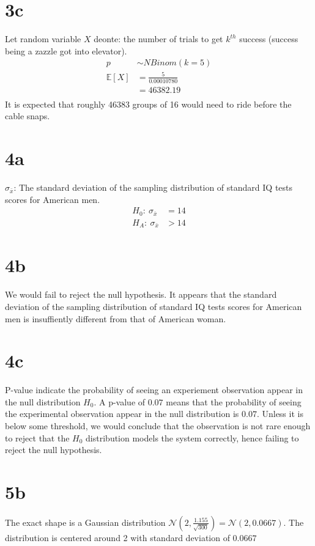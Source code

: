 \documentclass{article}
\begin{document}
\section*{3c}
Let random variable $X$ deonte: the number of trials to get $k^{th}$ success
(success being a zazzle got into elevator).
\begin{align*}
p &\sim NBinom(k=5)\\
\mathbb{E}[X] &= \frac{5}{0.00010780}\\
							&= 46382.19\\
\end{align*}
It is expected that roughly 46383 groups of 16 would need to ride before the
cable snaps.

\section*{4a}
$\sigma_{\bar{x}}$: The standard deviation of the sampling distribution of
standard IQ tests scores for American men.
\begin{align*}
H_0:\ \sigma_{\bar{x}} &= 14\\
H_A:\ \sigma_{\bar{x}} &> 14
\end{align*}

\section*{4b}
We would fail to reject the null hypothesis. It appears that the standard
deviation of the sampling distribution of standard IQ tests scores for American
men is insuffiently different from that of American woman.

\section*{4c}
P-value indicate the probability of seeing an experiement observation appear in
the null distribution $H_0$. A p-value of $0.07$ means that the probability of
seeing the experimental observation appear in the null distribution is $0.07$.
Unless it is below some threshold, we would conclude that the observation is not
rare enough to reject that the $H_0$ distribution models the system correctly,
hence failing to reject the null hypothesis.

\section*{5b}
The exact shape is a Gaussian distribution $\mathcal{N}(2,
\frac{1.155}{\sqrt{300}}) = \mathcal{N}(2, 0.0667)$. The distribution is
centered around 2 with standard deviation of $0.0667$
\end{document}

